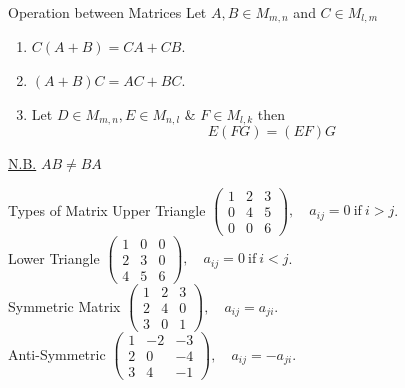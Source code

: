 \documentclass[11pt,a4paper]{article}
\begin{document}
\subtitle{Theorem 3.09 - }{Operation between Matrices}
Let $A, B \in M_{m,n}$ and $C \in M_{l,m}$
\begin{enumerate}[label=\roman*)]
  \item $C(A + B) = CA + CB$.
  \item $(A + B)C = AC + BC$.
  \item Let $D \in M_{m,n}, E \in M_{n,l}$ \& $F \in M_{l, k}$ then $$E(FG) = (EF)G$$
\end{enumerate}
\underline{N.B.} $AB \not = BA$ \\

\subtitle{Definition 3.10 - }{Types of Matrix}
Upper Triangle $\begin{pmatrix}
1 & 2 & 3 \\
0 & 4 & 5 \\
0 & 0 & 6
\end{pmatrix},\quad a_{ij} = 0 \mathrm{\ if\ } i > j$. \\
Lower Triangle $\begin{pmatrix}
1 & 0 & 0 \\
2 & 3 & 0 \\
4 & 5 & 6
\end{pmatrix},\quad a_{ij} = 0 \mathrm{\ if\ } i < j$. \\
Symmetric Matrix $\begin{pmatrix}
1 & 2 & 3 \\
2 & 4 & 0 \\
3 & 0 & 1
\end{pmatrix},\quad a_{ij} = a_{ji}.$ \\
Anti-Symmetric $\begin{pmatrix}
1 & -2 & -3 \\
2 & 0 & -4 \\
3 & 4 & -1
\end{pmatrix},\quad a_{ij} = -a_{ji}$. \\

\end{document}
